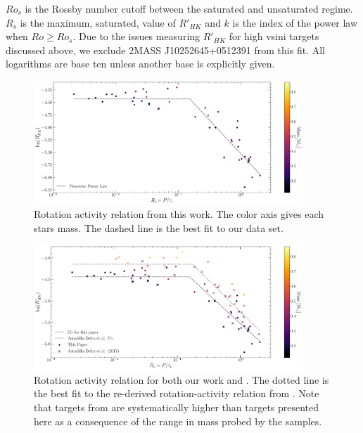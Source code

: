\noindent $Ro_{s}$ is the Rossby number cutoff between the saturated and
unsaturated regime. $R_{s}$ is the maximum, saturated, value of $R'_{HK}$ and
$k$ is the index of the power law when $Ro \geq Ro_{s}$. Due to the
issues measuring $R'_{HK}$ for high vsini targets discussed above, we exclude
2MASS J10252645+0512391 from this fit. All logarithms are base ten unless
another base is explicitly given.
\begin{table}[ht]
  \small
    \centering
    \setlength{\tabcolsep}{4pt}
    
  \caption{Calculated Rossby Numbers and $R'_{HK}$ values. All circular data
  points in Figures \ref{fig:RpHKvsRossbySelf} \& \ref{fig:RpHKvsRossbyDef} are
  present in this table. Masses are taken from the MEarth database. A machine
  readable version of this table is available. Rows where the activity metric
  is bolded were estimates derived from our model fit not empirical
  measurements.}
    \label{tab:finalData}
\end{table}
\begin{figure}
    \centering
    \includegraphics[width=0.9\textwidth]{figures/magActivity/RpHKvsR0_MC_justThisPaper.pdf}
	\caption{Rotation activity relation from this work. The color axis gives
	each stars mass. The dashed line is the best fit to our data set.}
    \label{fig:RpHKvsRossbySelf}
\end{figure}
\begin{figure}
    \centering
    \includegraphics[width=0.9\textwidth]{figures/magActivity/RpHKvsR0_MC.pdf}
	\caption{Rotation activity relation for both our work and \citet{Def17}.
	The dotted line is the best fit to the re-derived rotation-activity
	relation from \citet{Def17}.  Note that targets from \citet{Def17} are
	systematically higher than targets presented here as a consequence of the
	range in mass probed by the samples.}
    \label{fig:RpHKvsRossbyDef}
\end{figure}
